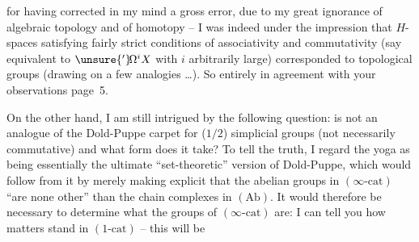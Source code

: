 for having corrected in my mind a gross error, due to my great ignorance of algebraic topology and of homotopy -- I was indeed under the impression that $H$-spaces satisfying fairly strict conditions of associativity and commutativity (say equivalent to $\unsure{{}'}\!\Omega^{i}X$ with $i$ arbitrarily large) corresponded to  topological groups (drawing on a few analogies \dots). So entirely in agreement with your observations page~5.

On the other hand, I am still intrigued by the following question: is  not an analogue of the Dold-Puppe carpet for ($1/2$) simplicial groups (not necessarily commutative) and what form does it take? To tell the truth, I regard the yoga
as being essentially the ultimate ``set-theoretic'' version of Dold-Puppe, which would follow from it by merely making explicit that the abelian groups in $(\infty\text{-cat})$ ``are none other'' than the chain complexes in $(\mathrm{Ab})$. It would therefore be necessary to determine what the groups of $(\infty\text{-cat})$ are: I can tell you how matters stand in $(1\text{-cat})$ -- this will be %
